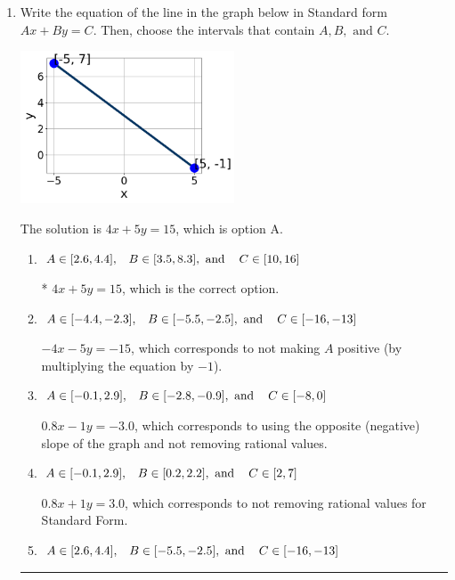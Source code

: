 \documentclass{extbook}[14pt]
\newcommand{\litem}[1]{\item #1

\rule{\textwidth}{0.4pt}}
\begin{document}
\begin{enumerate}\litem{
Write the equation of the line in the graph below in Standard form $Ax+By=C$. Then, choose the intervals that contain $A, B, \text{ and } C$.

\begin{center}
    \includegraphics[width=0.5\textwidth]{../Figures/linearGraphToStandardC.png}
\end{center}


The solution is \( 4x + 5y = 15 \), which is option A.\begin{enumerate}[label=\Alph*.]
\item \( A \in [2.6, 4.4], \hspace{3mm} B \in [3.5, 8.3], \text{ and } \hspace{3mm} C \in [10, 16] \)

* $4x + 5y = 15$, which is the correct option.
\item \( A \in [-4.4, -2.3], \hspace{3mm} B \in [-5.5, -2.5], \text{ and } \hspace{3mm} C \in [-16, -13] \)

 $-4x - 5y = -15$, which corresponds to not making $A$ positive (by multiplying the equation by $-1$).
\item \( A \in [-0.1, 2.9], \hspace{3mm} B \in [-2.8, -0.9], \text{ and } \hspace{3mm} C \in [-8, 0] \)

 $0.8x - 1y = -3.0$, which corresponds to using the opposite (negative) slope of the graph and not removing rational values.
\item \( A \in [-0.1, 2.9], \hspace{3mm} B \in [0.2, 2.2], \text{ and } \hspace{3mm} C \in [2, 7] \)

 $0.8x + 1y = 3.0$, which corresponds to not removing rational values for Standard Form.
\item \( A \in [2.6, 4.4], \hspace{3mm} B \in [-5.5, -2.5], \text{ and } \hspace{3mm} C \in [-16, -13] \)


\end{enumerate}}
\end{enumerate}
\end{document}
